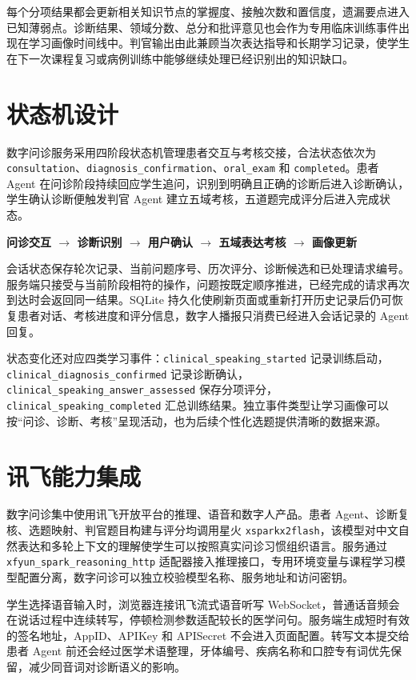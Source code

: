 每个分项结果都会更新相关知识节点的掌握度、接触次数和置信度，遗漏要点进入已知薄弱点。诊断结果、领域分数、总分和批评意见也会作为专用临床训练事件出现在学习画像时间线中。判官输出由此兼顾当次表达指导和长期学习记录，使学生在下一次课程复习或病例训练中能够继续处理已经识别出的知识缺口。

\section{状态机设计}

数字问诊服务采用四阶段状态机管理患者交互与考核交接，合法状态依次为 \texttt{consultation}、\texttt{diagnosis\_confirmation}、\texttt{oral\_exam} 和 \texttt{completed}。患者 Agent 在问诊阶段持续回应学生追问，识别到明确且正确的诊断后进入诊断确认，学生确认诊断便触发判官 Agent 建立五域考核，五道题完成评分后进入完成状态。

\begin{center}
  \textbf{问诊交互 $\rightarrow$ 诊断识别 $\rightarrow$ 用户确认 $\rightarrow$ 五域表达考核 $\rightarrow$ 画像更新}
\end{center}

会话状态保存轮次记录、当前问题序号、历次评分、诊断候选和已处理请求编号。服务端只接受与当前阶段相符的操作，问题按既定顺序推进，已经完成的请求再次到达时会返回同一结果。SQLite 持久化使刷新页面或重新打开历史记录后仍可恢复患者对话、考核进度和评分信息，数字人播报只消费已经进入会话记录的 Agent 回复。

状态变化还对应四类学习事件：\texttt{clinical\_speaking\_started} 记录训练启动，\texttt{clinical\_diagnosis\_confirmed} 记录诊断确认，\texttt{clinical\_speaking\_answer\_assessed} 保存分项评分，\texttt{clinical\_speaking\_completed} 汇总训练结果。独立事件类型让学习画像可以按“问诊、诊断、考核”呈现活动，也为后续个性化选题提供清晰的数据来源。

\section{讯飞能力集成}

数字问诊集中使用讯飞开放平台的推理、语音和数字人产品。患者 Agent、诊断复核、选题映射、判官题目构建与评分均调用星火 \texttt{xsparkx2flash}，该模型对中文自然表达和多轮上下文的理解使学生可以按照真实问诊习惯组织语言。服务通过 \texttt{xfyun\_spark\_reasoning\_http} 适配器接入推理接口，专用环境变量与课程学习模型配置分离，数字问诊可以独立校验模型名称、服务地址和访问密钥。

学生选择语音输入时，浏览器连接讯飞流式语音听写 WebSocket，普通话音频会在说话过程中连续转写，停顿检测参数适配较长的医学问句。服务端生成短时有效的签名地址，AppID、APIKey 和 APISecret 不会进入页面配置。转写文本提交给患者 Agent 前还会经过医学术语整理，牙体编号、疾病名称和口腔专有词优先保留，减少同音词对诊断语义的影响。

